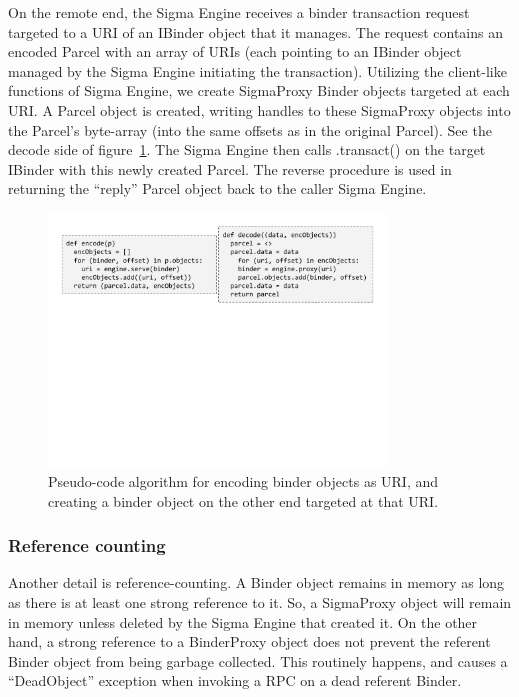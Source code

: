 \documentclass[prodmode]{acmlarge}
\begin{document}
On the remote end, the Sigma Engine receives a binder transaction request targeted to a URI of an IBinder object that it manages. The request contains an encoded Parcel with an array of URIs (each pointing to an IBinder object managed by the Sigma Engine initiating the transaction). Utilizing the client-like functions of Sigma Engine, we create SigmaProxy Binder objects targeted at each URI. A Parcel object is created, writing handles to these SigmaProxy objects into the Parcel's byte-array (into the same offsets as in the original Parcel). See the decode side of figure~\ref{fig:encodeParcel}. The Sigma Engine then calls .transact() on the target IBinder with this newly created Parcel. The reverse procedure is used in returning the ``reply'' Parcel object back to the caller Sigma Engine.

\begin{figure}[h]
\centering
\includegraphics[width=0.8\textwidth]{drawings/encodeObjects.pdf}
\caption{Pseudo-code algorithm for encoding binder objects as URI, and creating a binder object on the other end targeted at that URI.}
\label{fig:encodeParcel}
\end{figure}

\subsubsection{Reference counting}
\label{sec:ReferenceCounting}
Another detail is reference-counting. A Binder object remains in memory as long as there is at least one strong reference to it. So, a SigmaProxy object will remain in memory unless deleted by the Sigma Engine that created it. On the other hand, a strong reference to a BinderProxy object does not prevent the referent Binder object from being garbage collected. This routinely happens, and causes a ``DeadObject'' exception when invoking a RPC on a dead referent Binder.
\end{document}
